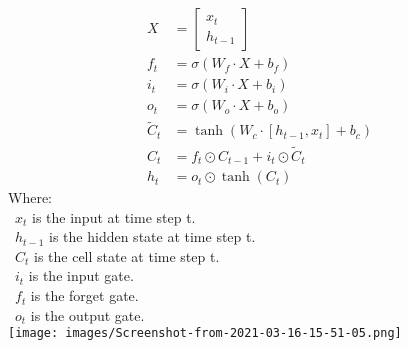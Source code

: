 \documentclass{ieeeojies}
\begin{document}
\begin{align*}
X &= \begin{bmatrix}
    x_t \\
    h_{t-1}
\end{bmatrix} \\
f_t &= \sigma(W_f \cdot X + b_f) \\
i_t &= \sigma(W_i \cdot X + b_i) \\
o_t &= \sigma(W_o \cdot X + b_o) \\
\tilde{C}_t &= \tanh(W_c \cdot [h_{t-1}, x_t] + b_c) \\
C_t &= f_t \odot C_{t-1} + i_t \odot \tilde{C}_t \\
h_t &= o_t \odot \tanh(C_t)
\end{align*}
Where:\\
\indent \textbullet\ \(x_t\) is the input at time step t.\\
\indent \textbullet\ \(h_{t-1}\) is the hidden state at time step t.\\
\indent \textbullet\ \(C_t\) is the cell state at time step t.\\
\indent \textbullet\ \(i_t\) is the input gate.\\
\indent \textbullet\ \(f_t\) is the forget gate.\\
\indent \textbullet\ \(o_t\) is the output gate.\\
\texttt{[image: images/Screenshot-from-2021-03-16-15-51-05.png]}
\end{document}

